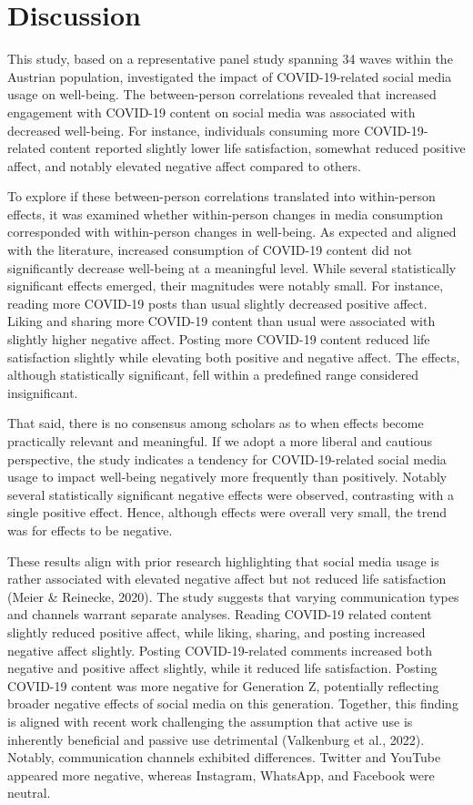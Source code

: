 \documentclass[
  man,mask,floatsintext]{apa7}
\begin{document}
\section{Discussion}\label{discussion}

This study, based on a representative panel study spanning 34 waves within the Austrian population, investigated the impact of COVID-19-related social media usage on well-being.
The between-person correlations revealed that increased engagement with COVID-19 content on social media was associated with decreased well-being.
For instance, individuals consuming more COVID-19-related content reported slightly lower life satisfaction, somewhat reduced positive affect, and notably elevated negative affect compared to others.

To explore if these between-person correlations translated into within-person effects, it was examined whether within-person changes in media consumption corresponded with within-person changes in well-being.
As expected and aligned with the literature, increased consumption of COVID-19 content did not significantly decrease well-being at a meaningful level.
While several statistically significant effects emerged, their magnitudes were notably small.
For instance, reading more COVID-19 posts than usual slightly decreased positive affect.
Liking and sharing more COVID-19 content than usual were associated with slightly higher negative affect.
Posting more COVID-19 content reduced life satisfaction slightly while elevating both positive and negative affect.
The effects, although statistically significant, fell within a predefined range considered insignificant.

That said, there is no consensus among scholars as to when effects become practically relevant and meaningful.
If we adopt a more liberal and cautious perspective, the study indicates a tendency for COVID-19-related social media usage to impact well-being negatively more frequently than positively.
Notably several statistically significant negative effects were observed, contrasting with a single positive effect.
Hence, although effects were overall very small, the trend was for effects to be negative.

These results align with prior research highlighting that social media usage is rather associated with elevated negative affect but not reduced life satisfaction (Meier \& Reinecke, 2020).
The study suggests that varying communication types and channels warrant separate analyses.
Reading COVID-19 related content slightly reduced positive affect, while liking, sharing, and posting increased negative affect slightly.
Posting COVID-19-related comments increased both negative and positive affect slightly, while it reduced life satisfaction.
Posting COVID-19 content was more negative for Generation Z, potentially reflecting broader negative effects of social media on this generation.
Together, this finding is aligned with recent work challenging the assumption that active use is inherently beneficial and passive use detrimental (Valkenburg et al., 2022).
Notably, communication channels exhibited differences.
Twitter and YouTube appeared more negative, whereas Instagram, WhatsApp, and Facebook were neutral.
\end{document}
